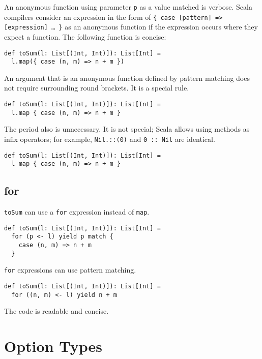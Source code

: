 An anonymous function using parameter \verb!p! as a value matched is verbose.
Scala compilers consider an expression in the form of \verb!{ case [pattern] => [expression] … }!
as an anonymous function if the expression occurs where they
expect a function. The following function is concise:

\begin{verbatim}
def toSum(l: List[(Int, Int)]): List[Int] =
  l.map({ case (n, m) => n + m })
\end{verbatim}

An argument that is an anonymous function defined by pattern matching does not
require surrounding round brackets. It is a special rule.

\begin{verbatim}
def toSum(l: List[(Int, Int)]): List[Int] =
  l.map { case (n, m) => n + m }
\end{verbatim}

The period also is unnecessary. It is not special; Scala allows using methods as
infix operators; for example, \verb!Nil.::(0)! and \verb!0 :: Nil! are identical.

\begin{verbatim}
def toSum(l: List[(Int, Int)]): List[Int] =
  l map { case (n, m) => n + m }
\end{verbatim}

\subsection{for}

\verb!toSum! can use a \verb!for! expression instead of \verb!map!.

\begin{verbatim}
def toSum(l: List[(Int, Int)]): List[Int] =
  for (p <- l) yield p match {
    case (n, m) => n + m
  }
\end{verbatim}

\verb!for! expressions can use pattern matching.

\begin{verbatim}
def toSum(l: List[(Int, Int)]): List[Int] =
  for ((n, m) <- l) yield n + m
\end{verbatim}

The code is readable and concise.

\section{Option Types}

